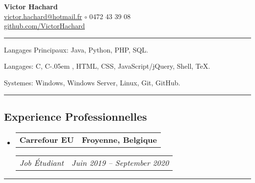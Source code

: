 \documentclass[10pt,letterpaper]{article}
\makeatletter
\newcommand{\Csharp}{%
  {\settoheight{\dimen0}{C}C\kern-.05em \resizebox{!}{\dimen0}{\raisebox{\depth}{\#}}}}
\newenvironment{indentsection}[1]
{\begin{list}{}
  {\setlength{\leftmargin}{#1}} \item[]
}
{\end{list}}
\newcommand{\headerrow}[2]
{\begin{tabular*}{\linewidth}{l@{\extracolsep{\fill}}r}
  #1 &
  #2 \\
\end{tabular*}}
\makeatother
\begin{document}
\begin{center}
  \huge \textbf{Victor Hachard} \\
  \large
  \href{mailto:victor.hachard@hotmail.fr}{victor.hachard@hotmail.fr}
  $\circ$
  0472 43 39 08
  \\
  \href{http://www.github.com/VictorHachard}{github.com/VictorHachard}
  \vspace{-0.2em}
\end{center}


\hrule
\begin{indentsection}{\parindent}
\begin{description*}
  \item[Langages Principaux:] Java, Python, PHP, SQL.
  \item[Langages:] C, \Csharp, HTML, CSS, JavaScript/jQuery, Shell, TeX.
  \item[Systemes:] Windows, Windows Server, Linux, Git, GitHub.
\end{description*}
\end{indentsection}


\hrule
\vspace{-0.4em}
\subsection*{Experience Professionnelles}
\begin{itemize}
  \parskip=0.1em

  \item
  \headerrow
    {\textbf{Carrefour EU}}
    {\textbf{Froyenne, Belgique}}
  \headerrow
    {\emph{Job Étudiant}}
    {\emph{Juin 2019 -- September 2020}}
  \end{itemize}


\hrule
\vspace{-0.4em}
\end{document}

